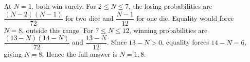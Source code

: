 At $N=1$, both win surely. For $2\le N\le 7$, the losing probabilities are $\dfrac{(N-2)(N-1)}{72}$ for two dice and $\dfrac{N-1}{12}$ for one die. Equality would force $N=8$, outside this range. For $7\le N\le 12$, winning probabilities are $\dfrac{(13-N)(14-N)}{72}$ and $\dfrac{13-N}{12}$. Since $13-N>0$, equality forces $14-N=6$, giving $N=8$. Hence the full answer is $\boxed{N=1,8}$.
